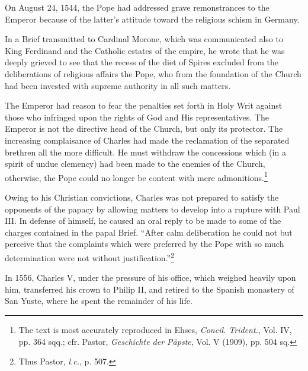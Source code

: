 On August 24, 1544, the Pope had addressed grave remonstrances
to the Emperor because of the latter’s attitude toward the religious
schism in Germany.

In a Brief transmitted to Cardinal Morone, which was communicated also
to King Ferdinand and the Catholic estates of the empire, he wrote that he
was deeply grieved to see that the recess of the diet of Spires excluded from
the deliberations of religious affairs the Pope, who from the foundation of
the Church had been invested with supreme authority in all such matters.

The Emperor had reason to fear the penalties set forth in Holy Writ against
those who infringed upon the rights of God and His representatives. The
Emperor is not the directive head of the Church, but only its protector. The
increasing complaisance of Charles had made the reclamation of the separated
brethren all the more difficult. He must withdraw the concessions
which (in a spirit of undue clemency) had been made to the enemies of the
Church, otherwise, the Pope could no longer be content with mere admonitions.\footnote
{The text is most accurately reproduced in Ehses, \textit{Concil. Trident.}, Vol. IV, pp. 364 sqq.;
cfr. Pastor, \textit{Geschichte der Päpste}, Vol. V (1909), pp. 504 sq.}

Owing to his Christian convictions, Charles was not prepared to satisfy
the opponents of the papacy by allowing matters to develop into a rupture
with Paul III. In defense of himself, he caused an oral reply to be made
to some of the charges contained in the papal Brief. “After calm deliberation
he could not but perceive that the complaints which were preferred by the
Pope with so much determination were not without justification.”\footnote
{Thus Pastor, \textit{l.c.}, p. 507.}

In 1556, Charles V, under the pressure of his office, which weighed
heavily upon him, transferred his crown to Philip II, and retired
to the Spanish monastery of San Yuste, where he spent the remainder
of his life.

